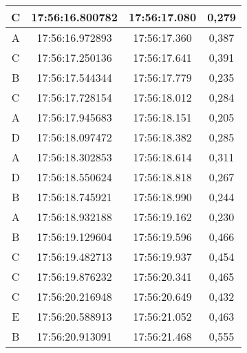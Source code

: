 \begin{table}[]
\begin{tabular}{|ccc|c|}
  \multicolumn{1}{|c|}{C}    & \multicolumn{1}{c|}{17:56:16.800782} & 17:56:17.080       & 0,279        \\ \hline
  \multicolumn{1}{|c|}{A}    & \multicolumn{1}{c|}{17:56:16.972893} & 17:56:17.360       & 0,387        \\ \hline
  \multicolumn{1}{|c|}{C}    & \multicolumn{1}{c|}{17:56:17.250136} & 17:56:17.641       & 0,391        \\ \hline
  \multicolumn{1}{|c|}{B}    & \multicolumn{1}{c|}{17:56:17.544344} & 17:56:17.779       & 0,235        \\ \hline
  \multicolumn{1}{|c|}{C}    & \multicolumn{1}{c|}{17:56:17.728154} & 17:56:18.012       & 0,284        \\ \hline
  \multicolumn{1}{|c|}{A}    & \multicolumn{1}{c|}{17:56:17.945683} & 17:56:18.151       & 0,205        \\ \hline
  \multicolumn{1}{|c|}{D}    & \multicolumn{1}{c|}{17:56:18.097472} & 17:56:18.382       & 0,285        \\ \hline
  \multicolumn{1}{|c|}{A}    & \multicolumn{1}{c|}{17:56:18.302853} & 17:56:18.614       & 0,311        \\ \hline
  \multicolumn{1}{|c|}{D}    & \multicolumn{1}{c|}{17:56:18.550624} & 17:56:18.818       & 0,267        \\ \hline
  \multicolumn{1}{|c|}{B}    & \multicolumn{1}{c|}{17:56:18.745921} & 17:56:18.990       & 0,244        \\ \hline
  \multicolumn{1}{|c|}{A}    & \multicolumn{1}{c|}{17:56:18.932188} & 17:56:19.162       & 0,230        \\ \hline
  \multicolumn{1}{|c|}{B}    & \multicolumn{1}{c|}{17:56:19.129604} & 17:56:19.596       & 0,466        \\ \hline
  \multicolumn{1}{|c|}{C}    & \multicolumn{1}{c|}{17:56:19.482713} & 17:56:19.937       & 0,454        \\ \hline
  \multicolumn{1}{|c|}{C}    & \multicolumn{1}{c|}{17:56:19.876232} & 17:56:20.341       & 0,465        \\ \hline
  \multicolumn{1}{|c|}{C}    & \multicolumn{1}{c|}{17:56:20.216948} & 17:56:20.649       & 0,432        \\ \hline
  \multicolumn{1}{|c|}{E}    & \multicolumn{1}{c|}{17:56:20.588913} & 17:56:21.052       & 0,463        \\ \hline
  \multicolumn{1}{|c|}{B}    & \multicolumn{1}{c|}{17:56:20.913091} & 17:56:21.468       & 0,555        \\ \hline

\end{tabular}
\end{table}
